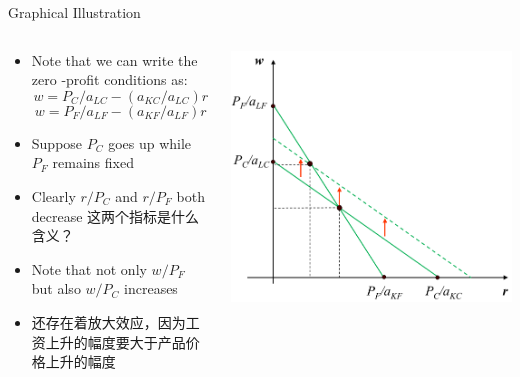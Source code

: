 \documentclass[10pt,hyperref={CJKbookmarks=true},xcolor=dvipsnames,aspectratio=169]{beamer}
\begin{document}
\begin{frame}{Graphical Illustration }


\begin{columns}[onlytextwidth]
\begin{column}{0.5\textwidth}
\begin{itemize}
\item Note that we can write the zero -profit conditions as: 
\[
w=P_{C}/a_{LC}-(a_{KC}/a_{LC})r
\]
\[
w=P_{F}/a_{LF}-(a_{KF}/a_{LF})r
\]

\item Suppose $P_{C}$ goes up while $P_{F}$ remains fixed 
\item Clearly $r/P_{C}$ and $r/P_{F}$ both decrease 这两个指标是什么含义？
\item Note that not only $w/P_{F}$ but also $w/P_{C}$ increases 
\item 还存在着放大效应，因为工资上升的幅度要大于产品价格上升的幅度
\end{itemize}

\end{column}
\begin{column}{0.5\textwidth}
\includegraphics[width=\columnwidth]{fig/ho/lec5-20}
\end{column}
\end{columns}

\end{frame}
\end{document}
